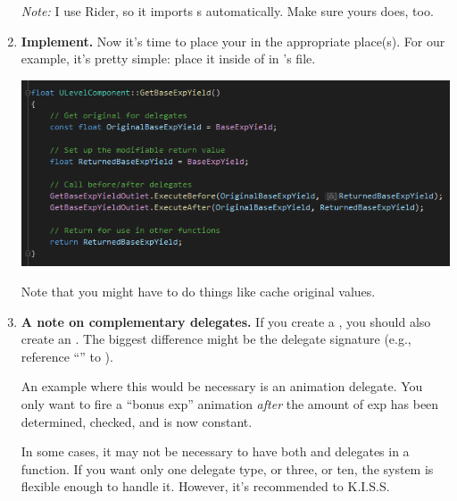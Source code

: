 \begin{enumerate}
{	\textit{Note:} I use Rider, so it imports s automatically. Make sure yours does, too.
	}
	\item{\textbf{Implement.} Now it's time to place your  in the appropriate place(s). For our example, it's pretty simple: place it inside of  in 's  file.
	\begin{center}
		\includegraphics[scale=\ScreenshotScale]{create-outlet-cpp}
	\end{center}
	Note that you might have to do things like cache original values.
	}
	\item{\textbf{A note on complementary delegates.} If you create a  , you should also create an  . The biggest difference might be the delegate signature (e.g., reference ``\code{\&}'' to ).
			
	An example where this would be necessary is an animation delegate. You only want to fire a ``bonus exp'' animation \textit{after} the amount of exp has been determined, checked, and is now constant.
	
	In some cases, it may not be necessary to have both  and  delegates in a function. If you want only one delegate type, or three, or ten, the system is flexible enough to handle it. However, it's recommended to K.I.S.S.
	}
\end{enumerate}







\postamble{}